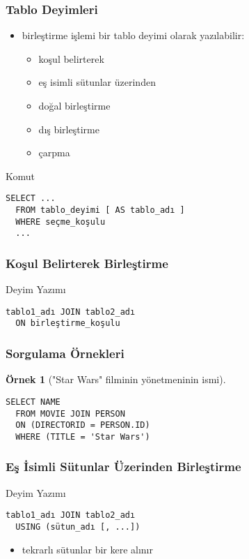\documentclass[dvipsnames]{beamer}
\theoremstyle{definition}
\theoremstyle{example}
\newtheorem{ornek}[theorem]{Örnek}
\theoremstyle{plain}
\begin{document}
\begin{frame}[fragile]
  \frametitle{Tablo Deyimleri}

  \begin{itemize}
    \item birleştirme işlemi bir tablo deyimi olarak yazılabilir:
    \begin{itemize}
      \item koşul belirterek
      \item eş isimli sütunlar üzerinden
      \item doğal birleştirme
      \item dış birleştirme
      \item çarpma
    \end{itemize}
  \end{itemize}

  \begin{block}{Komut}
    \begin{lstlisting}
SELECT ...
  FROM tablo_deyimi [ AS tablo_adı ]
  WHERE seçme_koşulu
  ...
    \end{lstlisting}
  \end{block}
\end{frame}

\begin{frame}[fragile]
  \frametitle{Koşul Belirterek Birleştirme}

  \begin{block}{Deyim Yazımı}
    \begin{lstlisting}
tablo1_adı JOIN tablo2_adı
  ON birleştirme_koşulu
    \end{lstlisting}
  \end{block}
\end{frame}

\begin{frame}[fragile]
  \frametitle{Sorgulama Örnekleri}

  \begin{ornek}["Star Wars" filminin yönetmeninin ismi]
    \begin{lstlisting}
SELECT NAME
  FROM MOVIE JOIN PERSON
  ON (DIRECTORID = PERSON.ID)
  WHERE (TITLE = 'Star Wars')
    \end{lstlisting}
  \end{ornek}
\end{frame}

\begin{frame}[fragile]
  \frametitle{Eş İsimli Sütunlar Üzerinden Birleştirme}

  \begin{block}{Deyim Yazımı}
    \begin{lstlisting}
tablo1_adı JOIN tablo2_adı
  USING (sütun_adı [, ...])
    \end{lstlisting}
  \end{block}

  \begin{itemize}
    \item tekrarlı sütunlar bir kere alınır
  \end{itemize}
\end{frame}
\end{document}
